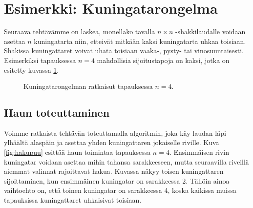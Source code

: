 \section{Esimerkki: Kuningatarongelma}

Seuraava tehtävämme on laskea, monellako tavalla
$n \times n$ -shakkilaudalle voidaan asettaa $n$ kuningatarta
niin, etteivät mitkään kaksi kuningatarta uhkaa toisiaan.
Shakissa kuningattaret voivat uhata toisiaan
vaaka-, pysty- tai vinosuuntaisesti.
Esimerkiksi tapauksessa $n=4$ mahdollisia sijoitustapoja on kaksi,
jotka on esitetty kuvassa \ref{fig:kuning}.


\begin{figure}
\center
{}
\caption{Kuningatarongelman ratkaisut tapauksessa $n=4$.}
\label{fig:kuning}
\end{figure}

\subsection{Haun toteuttaminen}

Voimme ratkaista tehtävän toteuttamalla algoritmin,
joka käy laudan läpi ylhäältä alaspäin ja asettaa yhden kuningattaren
jokaiselle riville.
Kuva \ref{fig:hakupuu} esittää haun toimintaa tapauksessa $n=4$.
Ensimmäisen rivin kuningatar voidaan asettaa mihin tahansa sarakkeeseen,
mutta seuraavilla riveillä aiemmat valinnat rajoittavat hakua.
Kuvassa näkyy toisen kuningattaren sijoittaminen,
kun ensimmäinen kuningatar on sarakkeessa 2.
Tällöin ainoa vaihtoehto on, että toinen kuningatar on sarakkeessa 4,
koska kaikissa muissa tapauksissa kuningattaret uhkaisivat toisiaan.


